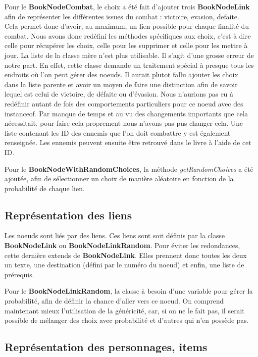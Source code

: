 			Pour le \textbf{BookNodeCombat}, le choix a été fait d'ajouter trois \textbf{BookNodeLink} afin de représenter les différentes issues du combat : victoire, evasion, defaite. Cela permet donc d'avoir, au maximum, un lien possible pour chaque finalité du combat. Nous avons donc redéfini les méthodes spécifiques aux choix, c'est à dire celle pour récupérer les choix, celle pour les supprimer et celle pour les mettre à jour. La liste de la classe mère n'est plus utilisable. Il s'agit d'une grosse erreur de notre part. En effet, cette classe demande un traitement spécial à presque tous les endroits où l'on peut gérer des noeuds. Il aurait plutot fallu ajouter les choix dans la liste parente et avoir un moyen de faire une distinction afin de savoir lequel est celui de victoire, de défaite ou d'évasion. Nous n'aurions pas eu à redéfinir autant de fois des comportements particuliers pour ce noeud avec des instanceof. Par manque de temps et au vu des changements importants que cela nécessitait, pour faire cela proprement nous n'avons pas pus changer cela. Une liste contenant les ID des ennemis que l'on doit combattre y est également renseignée. Les ennemis peuvent ensuite être retrouvé dans le livre à l'aide de cet ID.

			Pour le \textbf{BookNodeWithRandomChoices}, la méthode \textit{getRandomChoices} a été ajoutée, afin de sélectionner un choix de manière aléatoire en fonction de la probabilité de chaque lien.

		\subsection{Représentation des liens}
			\label{sub:liens}

			Les noeuds sont liés par des liens. Ces liens sont soit définis par la classe \textbf{BookNodeLink} ou \textbf{BookNodeLinkRandom}. Pour éviter les redondances, cette dernière extends de \textbf{BookNodeLink}. Elles prennent donc toutes les deux un texte, une destination (défini par le numéro du noeud) et enfin, une liste de prérequis.

			Pour le \textbf{BookNodeLinkRandom}, la classe à besoin d'une variable pour gérer la probabilité, afin de définir la chance d'aller vers ce noeud. On comprend maintenant mieux l'utilisation de la généricité, car, si on ne le fait pas, il serait possible de mélanger des choix avec probabilité et d'autres qui n'en possède pas.

		\subsection{Représentation des personnages, items}

